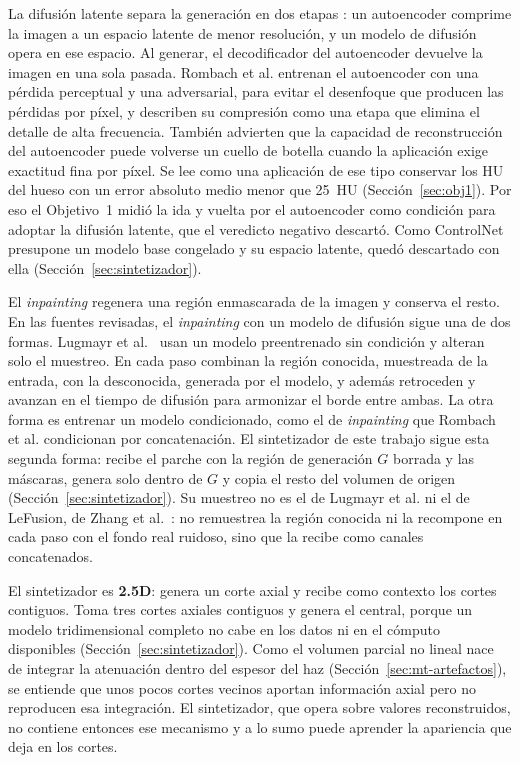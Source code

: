 La difusión latente separa la generación en dos etapas \cite{rombach2022latentdiffusion}: un autoencoder comprime la imagen a un espacio latente de menor resolución, y un modelo de difusión opera en ese espacio. Al generar, el decodificador del autoencoder devuelve la imagen en una sola pasada. Rombach et al. entrenan el autoencoder con una pérdida perceptual y una adversarial, para evitar el desenfoque que producen las pérdidas por píxel, y describen su compresión como una etapa que elimina el detalle de alta frecuencia. También advierten que la capacidad de reconstrucción del autoencoder puede volverse un cuello de botella cuando la aplicación exige exactitud fina por píxel. Se lee como una aplicación de ese tipo conservar los HU del hueso con un error absoluto medio menor que 25~HU (Sección~\ref{sec:obj1}). Por eso el Objetivo~1 midió la ida y vuelta por el autoencoder como condición para adoptar la difusión latente, que el veredicto negativo descartó. Como ControlNet presupone un modelo base congelado y su espacio latente, quedó descartado con ella (Sección~\ref{sec:sintetizador}).

El \emph{inpainting} regenera una región enmascarada de la imagen y conserva el resto. En las fuentes revisadas, el \emph{inpainting} con un modelo de difusión sigue una de dos formas. Lugmayr et al.~\cite{lugmayr2022repaint} usan un modelo preentrenado sin condición y alteran solo el muestreo. En cada paso combinan la región conocida, muestreada de la entrada, con la desconocida, generada por el modelo, y además retroceden y avanzan en el tiempo de difusión para armonizar el borde entre ambas. La otra forma es entrenar un modelo condicionado, como el de \emph{inpainting} que Rombach et al. condicionan por concatenación. El sintetizador de este trabajo sigue esta segunda forma: recibe el parche con la región de generación $G$ borrada y las máscaras, genera solo dentro de $G$ y copia el resto del volumen de origen (Sección~\ref{sec:sintetizador}). Su muestreo no es el de Lugmayr et al. ni el de LeFusion, de Zhang et al.~\cite{zhang2025lefusion}: no remuestrea la región conocida ni la recompone en cada paso con el fondo real ruidoso, sino que la recibe como canales concatenados.

El sintetizador es \textbf{2.5D}: genera un corte axial y recibe como contexto los cortes contiguos. Toma tres cortes axiales contiguos y genera el central, porque un modelo tridimensional completo no cabe en los datos ni en el cómputo disponibles (Sección~\ref{sec:sintetizador}). Como el volumen parcial no lineal nace de integrar la atenuación dentro del espesor del haz (Sección~\ref{sec:mt-artefactos}), se entiende que unos pocos cortes vecinos aportan información axial pero no reproducen esa integración. El sintetizador, que opera sobre valores reconstruidos, no contiene entonces ese mecanismo y a lo sumo puede aprender la apariencia que deja en los cortes.

